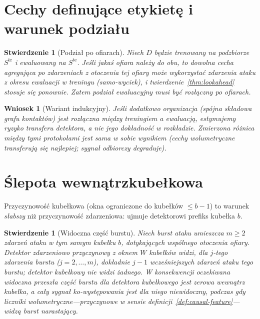 \documentclass[11pt]{article}
\newtheorem{proposition}[theorem]{Stwierdzenie}
\newtheorem{corollary}[theorem]{Wniosek}
\begin{document}
\section{Cechy definujące etykietę i warunek podziału}
\label{sec:split}

\begin{proposition}[Podział po ofiarach]
\label{prop:split}
Niech $D$ będzie trenowany na podzbiorze $S^{\mathrm{tr}}$ i
ewaluowany na $S^{\mathrm{te}}$. Jeśli jakaś ofiara należy do obu, to
dowolna cecha agregująca po zdarzeniach z otoczenia tej ofiary może
wykorzystać zdarzenia ataku z okresu ewaluacji w treningu
(\emph{samo-wyciek}), i twierdzenie~\ref{thm:lookahead} stosuje się
ponownie. Zatem podział ewaluacyjny musi być rozłączny po ofiarach.
\end{proposition}

\begin{corollary}[Wariant indukcyjny]
Jeśli dodatkowo \emph{organizacja} (spójna składowa grafu kontaktów)
jest rozłączna między treningiem a ewaluacją, estymujemy \emph{ryzyko
transferu} detektora, a nie jego dokładność w rozkładzie. Zmierzona
różnica między tymi protokołami jest sama w sobie wynikiem (cechy
wolumetryczne transferują się najlepiej; sygnał odbiorczy degraduje).
\end{corollary}

\section{Ślepota wewnątrzkubełkowa}
\label{sec:withinbucket}

Przyczynowość kubełkowa (okna ograniczone do kubełków $\le b-1$) to
warunek \emph{słabszy} niż przyczynowość zdarzeniowa: ujmuje detektorowi
prefiks kubełka $b$.

\begin{proposition}[Widoczna część burstu]
\label{prop:withinbucket}
Niech burst ataku umieszcza $m\ge2$ zdarzeń ataku w tym samym kubełku
$b$, dotykających wspólnego otoczenia ofiary. Detektor zdarzeniowo
przyczynowy z oknem $W$ kubełków widzi, dla $j$-tego zdarzenia burstu
($j=2,\dots,m$), dokładnie $j-1$ wcześniejszych zdarzeń ataku tego
burstu; detektor kubełkowy nie widzi żadnego. W konsekwencji oczekiwana
widoczna przeszła część burstu dla detektora kubełkowego jest zerowa
wewnątrz kubełka, a cały sygnał ko-występowania jest dla niego
niewidoczny, podczas gdy liczniki wolumetryczne---przyczynowe w sensie
definicji~\ref{def:causal-feature}---widzą burst narastający.
\end{proposition}
\end{document}
